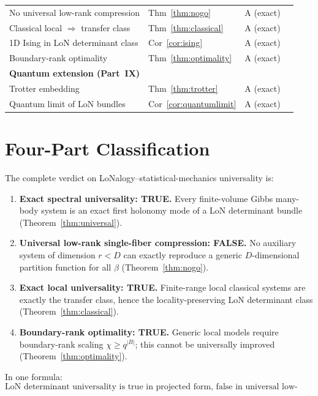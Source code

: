 \documentclass[12pt]{article}
\theoremstyle{plain}
\theoremstyle{definition}
\numberwithin{equation}{section}
\begin{document}
\begin{center}
\begin{tabular}{p{5.5cm}lll}
\quad No universal low-rank compression & Thm~\ref{thm:nogo} & A (exact)\\
\quad Classical local $\Rightarrow$ transfer class & Thm~\ref{thm:classical} & A (exact)\\
\quad 1D Ising in LoN determinant class & Cor~\ref{cor:ising} & A (exact)\\
\quad Boundary-rank optimality & Thm~\ref{thm:optimality} & A (exact)\\
\midrule
\multicolumn{3}{l}{\textbf{Quantum extension (Part~IX)}}\\
\quad Trotter embedding & Thm~\ref{thm:trotter} & A (exact)\\
\quad Quantum limit of LoN bundles & Cor~\ref{cor:quantumlimit} & A (exact)\\
\bottomrule
\end{tabular}
\end{center}

\section{Four-Part Classification}\label{sec:fourpart}

The complete verdict on LoNalogy--statistical-mechanics universality is:

\begin{enumerate}[label=\textbf{(\Alph*)}]
\item \textbf{Exact spectral universality: TRUE.}
Every finite-volume Gibbs many-body system is an exact first holonomy
mode of a LoN determinant bundle (Theorem~\ref{thm:universal}).

\item \textbf{Universal low-rank single-fiber compression: FALSE.}
No auxiliary system of dimension $r<D$ can exactly reproduce a generic
$D$-dimensional partition function for all $\beta$
(Theorem~\ref{thm:nogo}).

\item \textbf{Exact local universality: TRUE.}
Finite-range local classical systems are exactly the transfer class,
hence the locality-preserving LoN determinant class
(Theorem~\ref{thm:classical}).

\item \textbf{Boundary-rank optimality: TRUE.}
Generic local models require boundary-rank scaling $\chi\geq q^{|B|}$;
this cannot be universally improved (Theorem~\ref{thm:optimality}).
\end{enumerate}

In one formula:
\begin{equation}
\boxed{\text{LoN determinant universality is true in projected form,
false in universal low-rank fiber form,
and exact/optimal in transfer-boundary form.}}
\end{equation}
\end{document}
